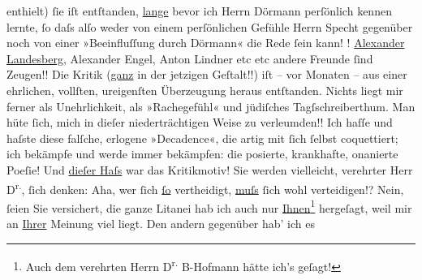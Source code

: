 \begin{ledgroupsized}[t]{13cm}
               enthielt) ſie iſt entſtanden, \uline{lange} bevor ich Herrn
                  Dörmann perſönlich kennen lernte, ſo daſs
               alſo weder von einem perſönlichen Gefühle {\pb}Herrn Specht gegenüber noch von einer
               »Beeinfluſſung durch Dörmann« die Rede ſein
               kann!\pend
           \pstart
           !\pend
           \pstart
           \uline{Alexander Landesberg}, Alexander Engel, Anton Lindner etc etc andere Freunde ſind Zeugen!!\pend
           \pstart
           Die Kritik (\uline{ganz} in der jetzigen Geſtalt!!) iſt – vor Monaten –
               aus einer ehrlichen, vollſten, ureigenſten Überzeugung heraus entſtanden. Nichts
               liegt mir ferner als Unehrlichkeit, als »Rachegefühl« und jüdiſches
               Tagſschreiberthum. Man hüte ſich, mich in dieſer niederträchtigen Weise zu
               verleumden!!\pend
           \pstart
           Ich haſſe und haſste diese falſche, erlogene »Decadence«, die artig mit ſich ſelbst
               coquettiert; ich bekämpfe und werde immer bekämpfen: die posierte, krankhafte,
               onanierte Poeſie! {\pb}Und \uline{dieſer Haſs} war das Kritikmotiv!\pend
           \pstart
            Sie werden vielleicht, verehrter Herr D\textsuperscript{r.}, ſich denken: Aha, wer ſich \uline{ſo} vertheidigt, \uline{muſs}{ }ſich wohl verteidigen!?  Nein, ſeien Sie versichert, die ganze Litanei hab ich auch nur \uline{Ihnen}\footnote{\noindent{}Auch dem verehrten Herrn D\textsuperscript{r.}{ }B-Hofmann hätte ich’s geſagt!} hergeſagt, weil mir an \uline{Ihrer} Meinung  viel liegt. Den andern gegenüber hab’ ich es

\end{ledgroupsized}
